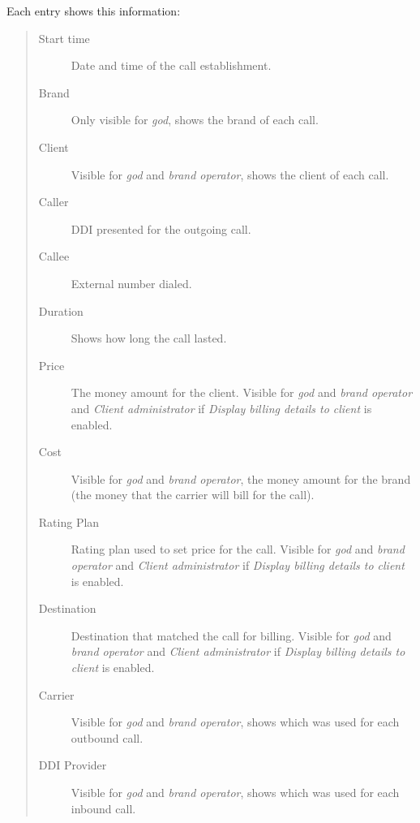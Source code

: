 \documentclass[letterpaper,10pt,english]{sphinxmanual}
\begin{document}
Each entry shows this information:
\begin{quote}
\begin{description}
\item[{Start time}] \leavevmode
Date and time of the call establishment.

\item[{Brand}] \leavevmode
Only visible for \emph{god}, shows the brand of each call.

\item[{Client}] \leavevmode
Visible for \emph{god} and \emph{brand operator}, shows the client of each call.

\item[{Caller}] \leavevmode
DDI presented for the outgoing call.

\item[{Callee}] \leavevmode
External number dialed.

\item[{Duration}] \leavevmode
Shows how long the call lasted.

\item[{Price}] \leavevmode
The money amount for the client. Visible for \emph{god} and \emph{brand operator} and \emph{Client administrator} if
\emph{Display billing details to client} is enabled.

\item[{Cost}] \leavevmode
Visible for \emph{god} and \emph{brand operator}, the money amount for the brand (the money that the carrier will bill for the call).

\item[{Rating Plan}] \leavevmode
Rating plan used to set price for the call. Visible for \emph{god} and \emph{brand operator} and \emph{Client administrator} if
\emph{Display billing details to client} is enabled.

\item[{Destination}] \leavevmode
Destination that matched the call for billing. Visible for \emph{god} and \emph{brand operator} and \emph{Client administrator} if
\emph{Display billing details to client} is enabled.

\item[{Carrier}] \leavevmode
Visible for \emph{god} and \emph{brand operator}, shows which {\hyperref[administration_portal/brand/providers/carriers:carriers]{}} was used for each outbound call.

\item[{DDI Provider}] \leavevmode
Visible for \emph{god} and \emph{brand operator}, shows which {\hyperref[administration_portal/brand/providers/ddi_providers:ddi\string-providers]{}} was used for each inbound call.


\end{description}
\end{quote}
\end{document}
